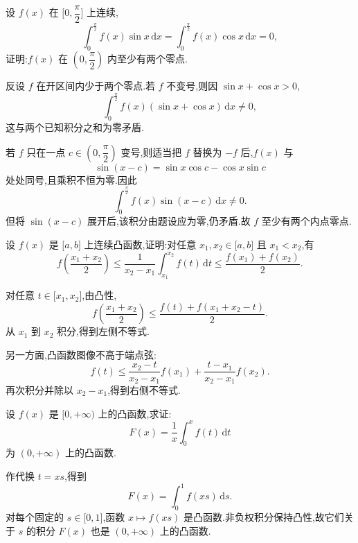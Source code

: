 \begin{example}
    设 $f(x)$ 在 $\lbrack 0,\dfrac{\pi}{2}\rbrack$ 上连续,
    \[
        \displaystyle\int_0^{\frac{\pi}{2}}f(x)\sin x\,\mathrm{d}x
        =\int_0^{\frac{\pi}{2}}f(x)\cos x\,\mathrm{d}x=0,
    \]
    证明:$f(x)$ 在 $\left(0,\dfrac{\pi}{2}\right)$ 内至少有两个零点.
\end{example}
\exampleblank

\begin{solution}
    反设 $f$ 在开区间内少于两个零点.若 $f$ 不变号,则因 $\sin x+\cos x>0$,
    \[
        \displaystyle\int_0^{\frac{\pi}{2}}f(x)(\sin x+\cos x)\,\mathrm{d}x\neq0,
    \]
    这与两个已知积分之和为零矛盾.

    若 $f$ 只在一点 $c\in(0,\dfrac{\pi}{2})$ 变号,则适当把 $f$ 替换为 $-f$ 后,$f(x)$ 与
    \[
        \sin(x-c)=\sin x\cos c-\cos x\sin c
    \]
    处处同号,且乘积不恒为零.因此
    \[
        \displaystyle\int_0^{\frac{\pi}{2}}f(x)\sin(x-c)\,\mathrm{d}x\neq0.
    \]
    但将 $\sin(x-c)$ 展开后,该积分由题设应为零,仍矛盾.故 $f$ 至少有两个内点零点.
\end{solution}

\begin{example}[Hadamard 定理]
    设 $f(x)$ 是 $\lbrack a,b\rbrack$ 上连续凸函数,证明:对任意 $x_1,x_2\in\lbrack a,b\rbrack$ 且 $x_1<x_2$,有
    \[
        f\left(\dfrac{x_1+x_2}{2}\right)
        \leq\dfrac{1}{x_2-x_1}\int_{x_1}^{x_2}f(t)\,\mathrm{d}t
        \leq\dfrac{f(x_1)+f(x_2)}{2}.
    \]
\end{example}
\exampleblank

\begin{solution}
    对任意 $t\in\lbrack x_1,x_2\rbrack$,由凸性,
    \[
        f\left(\dfrac{x_1+x_2}{2}\right)
        \leq\dfrac{f(t)+f(x_1+x_2-t)}{2}.
    \]
    从 $x_1$ 到 $x_2$ 积分,得到左侧不等式.

    另一方面,凸函数图像不高于端点弦:
    \[
        f(t)\leq
        \dfrac{x_2-t}{x_2-x_1}f(x_1)
        +\dfrac{t-x_1}{x_2-x_1}f(x_2).
    \]
    再次积分并除以 $x_2-x_1$,得到右侧不等式.
\end{solution}

\begin{example}
    设 $f(x)$ 是 $\lbrack 0,+\infty)$ 上的凸函数,求证:
    \[
        F(x)=\dfrac{1}{x}\int_0^xf(t)\,\mathrm{d}t
    \]
    为 $(0,+\infty)$ 上的凸函数.
\end{example}
\exampleblank

\begin{solution}
    作代换 $t=xs$,得到
    \[
        F(x)=\int_0^1f(xs)\,\mathrm{d}s.
    \]
    对每个固定的 $s\in\lbrack0,1\rbrack$,函数 $x\mapsto f(xs)$ 是凸函数.非负权积分保持凸性,故它们关于 $s$ 的积分 $F(x)$ 也是 $(0,+\infty)$ 上的凸函数.
\end{solution}

